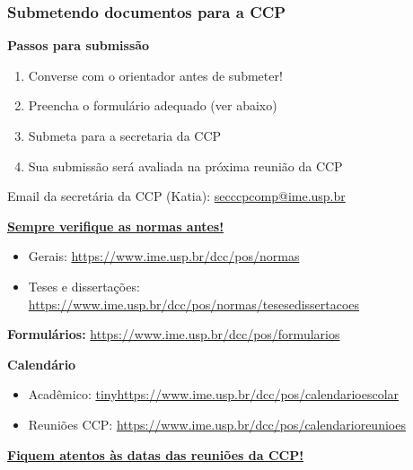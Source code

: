 \documentclass{beamer}
\begin{document}
\begin{frame}
  \frametitle{Submetendo documentos para a CCP}

  \small
  \textbf{Passos para submissão}
  \begin{enumerate}\footnotesize
    \item Converse com o orientador antes de submeter!
    \item Preencha o formulário adequado (ver abaixo)
    \item Submeta para a secretaria da CCP
    \item Sua submissão será avaliada na próxima reunião da CCP
  \end{enumerate}
  Email da secretária da CCP (Katia): \url{secccpcomp@ime.usp.br}\pause

  \textbf{\underline{Sempre verifique as normas antes!}}
  \begin{itemize}\footnotesize
    \item Gerais: {\tiny\url{https://www.ime.usp.br/dcc/pos/normas}}
      \item Teses e dissertações: {\tiny\url{https://www.ime.usp.br/dcc/pos/normas/tesesedissertacoes}}
  \end{itemize}\pause

  \textbf{Formulários:} {\tiny\url{https://www.ime.usp.br/dcc/pos/formularios}}

  \textbf{Calendário}
  \begin{itemize}\footnotesize
    \item Acadêmico: {\tiny\url{tinyhttps://www.ime.usp.br/dcc/pos/calendarioescolar}}
    \item Reuniões CCP: {\tiny\url{https://www.ime.usp.br/dcc/pos/calendarioreunioes}}
  \end{itemize}\pause

  \textbf{\underline{Fiquem atentos às datas das reuniões da CCP!}}
\end{frame}
\end{document}
